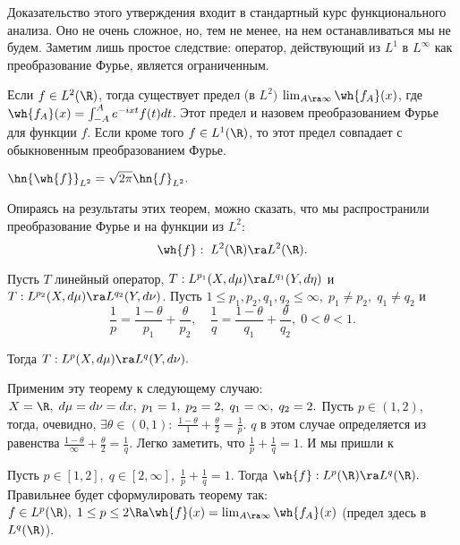 \documentclass{article}
\begin{document}
Доказательство этого утверждения входит в стандартный курс функционального анализа. Оно не очень сложное, но,
тем не менее, на нем останавливаться мы не будем. Заметим лишь простое следствие: оператор, действующий из
$L^1$ в $L^{\infty}$ как преобразование Фурье, является ограниченным.

\begin{theorem}[Планшерель] Если $f\in L^2(\R )$, тогда существует предел (в $L^2)$ $\lim_{A\ra\infty}\wh{f_A}(x)$, где $\wh{f_A}(x)=\int_{-A}^A
e^{-ixt}f(t)dt$. Этот предел и назовем преобразованием Фурье для
функции $f$. Если кроме того $f\in L^1(\R )$, то этот предел совпадает
с обыкновенным преобразованием Фурье.
\end{theorem}

\begin{theorem}
  $\hn{\wh{f}}_{L^2}=\sqrt{2\pi}\hn{f}_{L^2}.$
\end{theorem}

Опираясь на результаты этих теорем, можно сказать, что мы распространили преобразование Фурье и на функции из
$L^2$:
$$\wh{f}:\;L^2(\R )\ra L^2(\R ).$$

\begin{theorem} Пусть $T$ линейный оператор, $T:L^{p_1}(X,d\mu)\ra
L^{q_1}(Y,d\eta)$ и $T:L^{p_2}(X,d\mu)\ra L^{q_2}(Y,d\nu)$. Пусть $1\le
p_1,p_2,q_1,q_2\le\infty,\;p_1\neq p_2,\;q_1\neq q_2$ и
\begin{equation}\label{102}
\frac1p=\frac{1-\theta}{p_1}+\frac{\theta}{p_2},\quad
\frac1q=\frac{1-\theta}{q_1}+\frac{\theta}{q_2},\;0<\theta<1.
\end{equation}

Тогда $T:L^{p}(X,d\mu)\ra L^{q}(Y,d\nu).$
\end{theorem}

Применим эту теорему к следующему случаю: $X=\R
,\;d\mu=d\nu=dx,\;p_1=1,\;p_2=2,\;q_1=\infty,\;q_2=2.$ Пусть
$p\in(1,2)$, тогда, очевидно, $\exi\theta\in(0,1):\;\frac{1-\theta}1+\frac{\theta}2=\frac1p.$ $q$ в
этом случае определяется из равенства
$\frac{1-\theta}{\infty}+\frac{\theta}2=\frac1q.$ Легко заметить, что
$\frac1p+\frac1q=1.$ И мы пришли к

\begin{theorem}
Пусть $p\in[1,2],\;q\in[2,\infty],\;\frac1p+\frac1q=1$. Тогда $\wh{f}:L^p(\R )\ra
L^q(\R ).$ Правильнее будет сформулировать теорему так: $f\in L^p(\R ),\;1\le
p\le2\Ra \wh{f}(x)=\lim_{A\ra\infty} \wh{f_A}(x)$ (предел здесь в
$L^q(\R )$).
\end{theorem}
\end{document}
